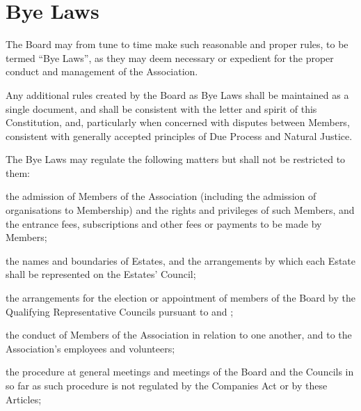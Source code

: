 \documentclass[10pt]{mk-articles-of-association}
\newcommand{\EC}[0]{Board}
\newcommand{\Exec}[0]{\EC{} }
\begin{document}

\section{Bye Laws}

\begin{constenum}

\item The \Exec may from tune to time make such reasonable and proper
  rules, to be termed ``Bye Laws'', as they may deem necessary or
  expedient for the proper conduct and management of the Association.

\item Any additional rules created by the \Exec as Bye Laws
  shall be maintained as a single document, and shall be
  consistent with the letter and spirit of this Constitution, and,
  particularly when concerned with disputes between Members,
  consistent with generally accepted principles of Due Process and
  Natural Justice.

\item The Bye Laws may regulate the following matters but shall not be
  restricted to them:

\begin{constenum}

\item the admission of Members of the Association (including the admission
  of organisations to Membership) and the rights and privileges of
  such Members, and the entrance fees, subscriptions and other fees or
  payments to be made by Members;

\item the names and boundaries of Estates, and the arrangements by which each
  Estate shall be represented on the Estates' Council;

\item the arrangements for the election or appointment of members of
  the \Exec by the Qualifying Representative Councils pursuant to
   and ;

\item the conduct of Members of the Association in relation to one
  another, and to the Association's employees and volunteers;

\item the procedure at general meetings and meetings of the \Exec and
  the Councils in so far as such procedure is not regulated by the
  Companies Act or by these Articles;


\end{constenum}
\end{constenum}
\end{document}
